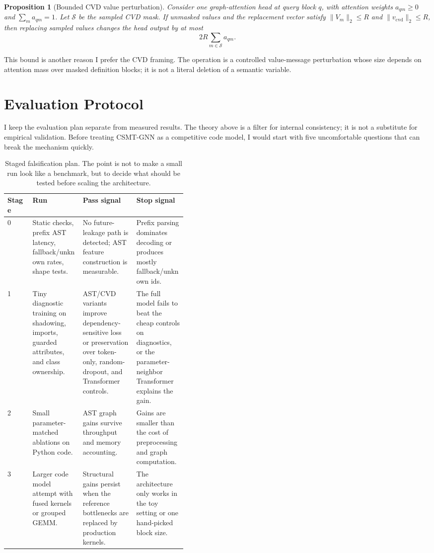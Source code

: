 \documentclass[10pt]{article}
\newtheorem{proposition}{Proposition}
\begin{document}
\begin{proposition}[Bounded CVD value perturbation]
\label{prop:cvd-bound}
Consider one graph-attention head at query block $q$, with attention weights
$a_{qm}\ge 0$ and $\sum_m a_{qm}=1$.  Let $\mathcal{S}$ be the sampled CVD mask.
If unmasked values and the replacement vector satisfy
$\|V_m\|_2\le R$ and $\|v_{\mathrm{cvd}}\|_2\le R$, then replacing sampled values
changes the head output by at most
\[
  2R \sum_{m\in\mathcal{S}} a_{qm}.
\]
\end{proposition}


This bound is another reason I prefer the CVD framing.  The operation is a
controlled value-message perturbation whose size depends on attention mass over
masked definition blocks; it is not a literal deletion of a semantic variable.

\section{Evaluation Protocol}

I keep the evaluation plan separate from measured results.  The theory above is
a filter for internal consistency; it is not a substitute for empirical
validation.  Before treating CSMT-GNN as a competitive code model, I would start
with five uncomfortable questions that can break the mechanism quickly.

\begin{table}[t]
  \centering
  \caption{Staged falsification plan.  The point is not to make a small run look
  like a benchmark, but to decide what should be tested before scaling the
  architecture.}
  \label{tab:stages}
  \begin{tabularx}{\linewidth}{P{0.14\linewidth}P{0.28\linewidth}YY}
    \toprule
    Stage & Run & Pass signal & Stop signal \\
     & Static checks, prefix AST latency, fallback/unknown rates, shape tests. &
    No future-leakage path is detected; AST feature construction is measurable. &
    Prefix parsing dominates decoding or produces mostly fallback/unknown ids. \\
    1 & Tiny diagnostic training on shadowing, imports, guarded attributes, and
    class ownership. &
    AST/CVD variants improve dependency-sensitive loss or preservation over
    token-only, random-dropout, and Transformer controls. &
    The full model fails to beat the cheap controls on diagnostics, or the
    parameter-neighbor Transformer explains the gain. \\
    2 & Small parameter-matched ablations on Python code. &
    AST graph gains survive throughput and memory accounting. &
    Gains are smaller than the cost of preprocessing and graph computation. \\
    3 & Larger code model attempt with fused kernels or grouped GEMM. &
    Structural gains persist when the reference bottlenecks are replaced by
    production kernels. &
    The architecture only works in the toy setting or one hand-picked block
    size. \\
    \bottomrule
  \end{tabularx}
\end{table}
\end{document}
